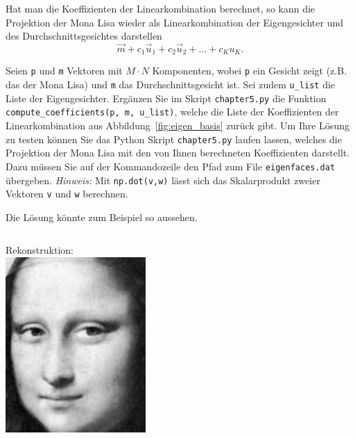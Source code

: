 Hat man die Koeffizienten der Linearkombination berechnet, so kann die Projektion der Mona Lisa wieder als Linearkombination der Eigengesichter und des Durchschnittsgesichtes darstellen
\begin{equation*}
	\vec m+c_1\vec u_1+c_2\vec u_2+\ldots+c_Ku_K.
\end{equation*}
\begin{aufgabe} \label{aufg:compute_coefficients}
	Seien \texttt{p} und \texttt{m} Vektoren mit $M\cdot N$ Komponenten, wobei \texttt{p} ein Gesicht zeigt (z.B. das der Mona Lisa) und \texttt{m} das Durchschnittsgesicht ist.
	Sei zudem \texttt{u\_list} die Liste der Eigengesichter.
	Ergänzen Sie im Skript \texttt{chapter5.py} die Funktion \texttt{compute\_coefficients(p, m, u\_list)}, welche die Liste der Koeffizienten der Linearkombination aus Abbildung~\ref{fig:eigen_basis} zurück gibt.
	Um Ihre Lösung zu testen können Sie das Python Skript \texttt{chapter5.py} laufen lassen, welches die Projektion der Mona Lisa mit den von Ihnen berechneten Koeffizienten darstellt.
	Dazu müssen Sie auf der Kommandozeile den Pfad zum File \texttt{eigenfaces.dat} übergeben.
	\textit{Hinweis:} Mit \texttt{np.dot(v,w)} lässt sich das Skalarprodukt zweier Vektoren \texttt{v} und \texttt{w} berechnen.
\end{aufgabe}
\begin{losung}
	Die Lösung könnte zum Beispiel so aussehen.\\[0.5cm]
	\begin{minipage}{0.65\textwidth}
\inputminted[frame=single,framesep=5pt,firstline=3,lastline=8]{python}{codes/solution/chapter5.py}
	\end{minipage}\hfill
	\begin{minipage}{0.35\textwidth}\vspace{-1cm}
		\centering Rekonstruktion:\\[0.5cm]
		\includegraphics[width=0.4\textwidth]{images/eigenfaces/mona_lisa_eigen_approx}
	\end{minipage}
\end{losung}


